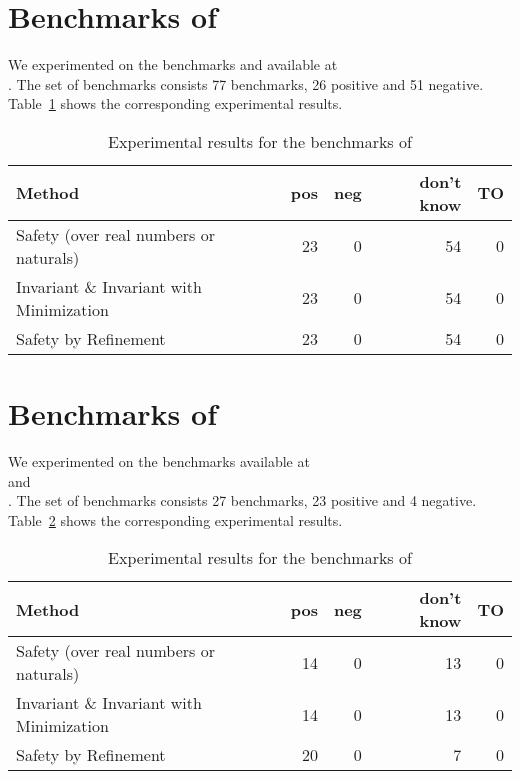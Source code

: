 \documentclass{llncs}
\begin{document}
\iffalse

\newpage
\section{Benchmarks of \bfc}

We experimented on the benchmarks  and
 available at \\
.
The set of benchmarks consists 77 benchmarks, 26 positive and 51 negative.
Table~\ref{bfc-experiments} shows the corresponding experimental results.

\begin{table}[h]
\begin{center}
  \begin{tabular}{ | p{7cm} | r | r | r | r | } %
    \hline
    Method & pos & neg & don't know & TO \\
    \hline
    Safety (over real numbers or naturals)      & 23 &  0 & 54 &  0 \\
    Invariant \& Invariant with Minimization    & 23 &  0 & 54 &  0 \\
    Safety by Refinement                        & 23 &  0 & 54 &  0 \\
    \hline
  \end{tabular}
\end{center}
\caption{Experimental results for the benchmarks of \bfc}
\label{bfc-experiments}
\end{table}

\section{Benchmarks of \mist}

We experimented on the benchmarks available at \\
and \\
.
The set of benchmarks consists 27 benchmarks, 23 positive and 4 negative.
Table~\ref{mist-experiments} shows the corresponding experimental results.

\begin{table}[h]
\begin{center}
  \begin{tabular}{ | p{6cm} | r | r | r | r | }
    \hline
    Method & pos & neg & don't know & TO \\
    \hline
    Safety (over real numbers or naturals)      & 14 &  0 & 13 &  0 \\
    Invariant \& Invariant with Minimization    & 14 &  0 & 13 &  0 \\
    Safety by Refinement                        & 20 &  0 &  7 &  0 \\
    \hline
  \end{tabular}
\end{center}
\caption{Experimental results for the benchmarks of \mist}
\label{mist-experiments}
\end{table}
\end{document}
